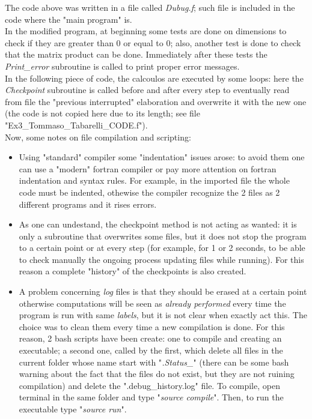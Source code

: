 \documentclass[12pt, a4paper, notitlepage]{report}
\begin{document}
The code above was written in a file called \textit{Dubug.f}; such file is included in the code where the "main program" is.\\
In the modified program, at beginning some tests are done on dimensions to check if they are greater than 0 or equal to 0; also, another test is done to check that the matrix product can be done. Immediately after these tests the \textit{Print\_error} subroutine is called to print proper error messages.\\
In the following piece of code, the calcoulos are executed by some loops: here the \textit{Checkpoint} subroutine is called before and after every step to eventually read from file the "previous interrupted" elaboration and overwrite it with the new one (the code is not copied here due to its length; see file "Ex3\_Tommaso\_Tabarelli\_CODE.f").\\

Now, some notes on file compilation and scripting:
\begin{itemize}
	\item Using "standard" compiler some "indentation" issues arose: to avoid them one can use a "modern" fortran compiler or pay more attention on fortran indentation and syntax rules. For example, in the imported file the whole code must be indented, othewise the compiler recognize the 2 files as 2 different programs and it rises errors.
	\item As one can undestand, the checkpoint method is not acting as wanted: it is only a subroutine that overwrites some files, but it does not stop the program to a certain point or at every step (for example, for 1 or 2 seconds, to be able to check manually the ongoing process updating files while running). For this reason a complete "history" of the checkpoints is also created.
	\item A problem concerning \textit{log} files is that they should be erased at a certain point otherwise computations will be seen as \textit{already performed} every time the program is run with same \textit{labels}, but it is not clear when exactly act this. The choice was to clean them every time a new compilation is done. For this reason, 2 bash scripts have been create: one to compile and creating an executable; a second one, called by the first, which delete all files in the current folder whose name start with "\textit{.Status\_}" (there can be some bash warning about the fact that the files do not exist, but they are not ruining compilation) and delete the ".debug\_history.log" file. To compile, open terminal in the same folder and type "\textit{source compile}". Then, to run the executable type "\textit{source run}".
\end{itemize}
\end{document}
